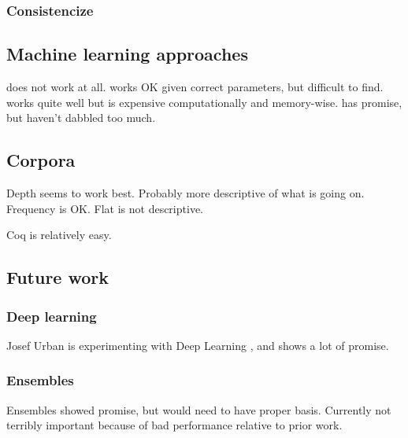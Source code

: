 \subsubsection{Consistencize}

\subsection{Machine learning approaches}

\knnadaptive does not work at all.
\nb works OK given correct parameters, but difficult to find.
\adarank works quite well but is expensive computationally and memory-wise.
\ensemble has promise, but haven't dabbled too much.

\subsection{Corpora}
Depth seems to work best. Probably more descriptive of what is going on.
Frequency is OK.
Flat is not descriptive.

Coq is relatively easy.

\subsection{Future work}
\subsubsection{Deep learning}
Josef Urban is experimenting with Deep Learning \cite{loos2017deep}, and shows a lot of promise.

\subsubsection{Ensembles}
Ensembles showed promise, but would need to have proper basis.
Currently not terribly important because of bad performance relative to prior work.

